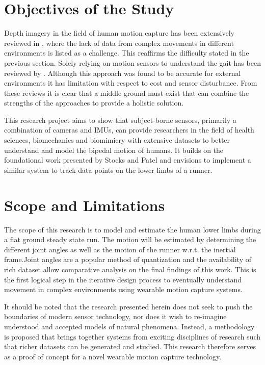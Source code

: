   
\section{Objectives of the Study}
Depth imagery in the field of human motion capture has been extensively reviewed in \cite{chen2013survey}, where the lack of data from complex movements in different environments is listed as a challenge. This reaffirms the difficulty stated in the previous section.  Solely relying on motion sensors to understand the gait has been reviewed by \cite{picerno201725}. Although this approach was found to be accurate for external environments it has limitation with respect to cost and sensor disturbance. From these reviews it is clear that a middle ground must exist that can combine the strengths of the approaches to provide a holistic solution.

This research project aims to show that subject-borne sensors, primarily a combination of cameras and IMUs, can provide researchers in the field of health sciences, biomechanics and biomimicry with extensive datasets to better understand and model the bipedal motion of humans. It builds on the foundational work presented by Stocks and Patel \cite{bradstocks} and envisions to implement a similar system to track data points on the lower limbs of a runner.


\section{Scope and Limitations}
The scope of this research is to model and estimate the human lower limbs during a flat ground steady state run. The motion will be estimated by determining the different joint angles as well as the motion of the runner w.r.t. the inertial frame.Joint angles are a popular method of quantization and the availability of rich dataset allow comparative analysis on the final findings of this work. This is the first logical step in the iterative design process to eventually understand movement in complex environments using wearable motion capture systems.

It should be noted that the research presented herein does not seek to push the boundaries of modern sensor technology, nor does it wish to re-imagine understood and accepted models of natural phenomena. Instead, a methodology is proposed that brings together systems from exciting disciplines of research such that richer datasets can be generated and studied. This research therefore serves as a proof of concept for a novel wearable motion capture technology.

